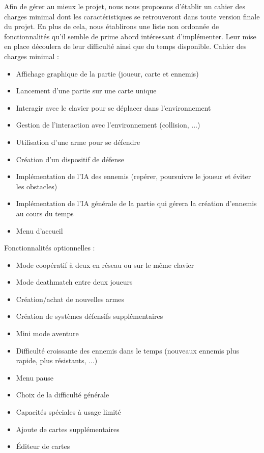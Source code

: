 Afin de gérer au mieux le projet, nous nous proposons d’établir un cahier des charges minimal dont les
caractéristiques se retrouveront dans toute version finale du projet. En plus de cela, nous établirons une liste
non ordonnée de fonctionnalités qu’il semble de prime abord intéressant d’implémenter. Leur mise en place
découlera de leur difficulté ainsi que du temps disponible.
Cahier des charges minimal :
\begin{itemize}
\item Affichage graphique de la partie (joueur, carte et ennemis)
\item Lancement d’une partie sur une carte unique
\item Interagir avec le clavier pour se déplacer dans l’environnement
\item Gestion de l’interaction avec l’environnement (collision, ...)
\item Utilisation d’une arme pour se défendre
\item Création d’un dispositif de défense
\item Implémentation de l’IA des ennemis (repérer, poursuivre le joueur et éviter les obstacles)
\item Implémentation de l’IA générale de la partie qui gérera la création d’ennemis au cours du temps
\item Menu d’accueil
\end{itemize}
Fonctionnalités optionnelles :
\begin{itemize}
\item Mode coopératif à deux en réseau ou sur le même clavier
\item Mode deathmatch entre deux joueurs
\item Création/achat de nouvelles armes
\item Création de systèmes défensifs supplémentaires
\item Mini mode aventure
\item Difficulté croissante des ennemis dans le temps (nouveaux ennemis plus rapide, plus résistants, ...)
\item Menu pause
\item Choix de la difficulté générale
\item Capacités spéciales à usage limité
\item Ajoute de cartes supplémentaires
\item Éditeur de cartes
\end{itemize}